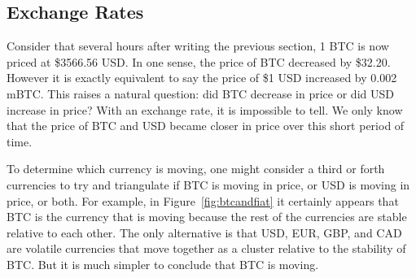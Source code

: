 \subsection{Exchange Rates}

Consider that several hours after writing the previous section, 1 BTC is now priced at \$3566.56 USD. In one sense, the price of BTC decreased by \$32.20. However it is exactly equivalent to say the price of \$1 USD increased by 0.002 mBTC. This raises a natural question: did BTC decrease in price or did USD increase in price? With an exchange rate, it is impossible to tell. We only know that the price of BTC and USD became closer in price over this short period of time.

To determine which currency is moving, one might consider a third or forth currencies to try and triangulate if BTC is moving in price, or USD is moving in price, or both. For example, in Figure~\ref{fig:btcandfiat} it certainly appears that BTC is the currency that is moving because the rest of the currencies are stable relative to each other. The only alternative is that USD, EUR, GBP, and CAD are volatile currencies that move together as a cluster relative to the stability of BTC. But it is much simpler to conclude that BTC is moving.

